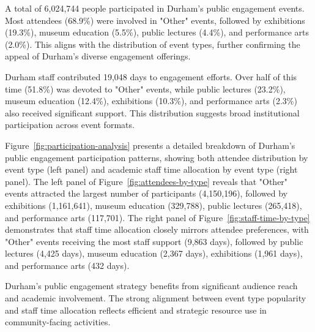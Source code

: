 \documentclass[journal,onecolumn, 10pt,draftclsnofoot]{IEEEtran}
\begin{document}
A total of 6,024,744 people participated in Durham's public engagement events. Most attendees (68.9\%) were involved in "Other" events, followed by exhibitions (19.3\%), museum education (5.5\%), public lectures (4.4\%), and performance arts (2.0\%). This aligns with the distribution of event types, further confirming the appeal of Durham's diverse engagement offerings.

Durham staff contributed 19,048 days to engagement efforts. Over half of this time (51.8\%) was devoted to "Other" events, while public lectures (23.2\%), museum education (12.4\%), exhibitions (10.3\%), and performance arts (2.3\%) also received significant support. This distribution suggests broad institutional participation across event formats.

Figure~\ref{fig:participation-analysis} presents a detailed breakdown of Durham's public engagement participation patterns, showing both attendee distribution by event type (left panel) and academic staff time allocation by event type (right panel). The left panel of Figure~\ref{fig:attendees-by-type} reveals that "Other" events attracted the largest number of participants (4,150,196), followed by exhibitions (1,161,641), museum education (329,788), public lectures (265,418), and performance arts (117,701). The right panel of Figure~\ref{fig:staff-time-by-type} demonstrates that staff time allocation closely mirrors attendee preferences, with "Other" events receiving the most staff support (9,863 days), followed by public lectures (4,425 days), museum education (2,367 days), exhibitions (1,961 days), and performance arts (432 days).

Durham's public engagement strategy benefits from significant audience reach and academic involvement. The strong alignment between event type popularity and staff time allocation reflects efficient and strategic resource use in community-facing activities.
\end{document}
